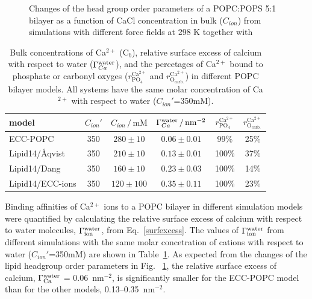 \begin{figure}[htb!]
  \caption{\label{fig:delta_ordPar_CaCl} 
    Changes of the head group order parameters of a POPC:POPS 5:1 bilayer as a function of CaCl concentration 
    in bulk ($C_{ion}$) from simulations with different force fields at 298 K together with  
  } 
\end{figure} 


\begin{table}[tb!] 
  \caption{Bulk concentrations of Ca$^{2+}$ (C$_b$), relative surface excess of calcium with respect to water ($\Gamma_{Ca}^{\rm water}$), 
    and the percetages of Ca$^{2+}$ bound to phosphate or carbonyl oxyges ($r^\mathrm{Ca^{2+}} _\mathrm{PO_4} $ and $r^\mathrm{Ca^{2+}} _\mathrm{O_{carb.}}$) 
    in different POPC bilayer models. All systems have the same molar concentration of Ca$^{2+}$ with respect to water ($C_{ion}'$=350mM). 
  \label{tab:binding}} 
  \begin{tabular}{l|c c | c | c c} 
    model                  & $C_{ion}'$ & $C_{ion}\,/\,\mathrm{mM}$ & $\Gamma_{Ca}^{\rm water} \,/\, \mathrm{nm}^{-2}$  & $r^\mathrm{Ca^{2+}} _\mathrm{PO_4} $ & $r^\mathrm{Ca^{2+}} _\mathrm{O_{carb.}} $ \\ 
    \hline 
    ECC-POPC             &  350  &  $280\pm 10 $  &  $0.06 \pm 0.01 $                           &  99\%  &    25\%    \\ 
    Lipid14/Åqvist     &  350  &  $210\pm 10 $  &  $0.13 \pm 0.01 $                          & 100\%  &    37\%     \\ 
    Lipid14/Dang           &  350  &  $160\pm 10 $  &  $0.23 \pm 0.03 $                            & 100\%  &    14\%    \\ 
    Lipid14/ECC-ions       &  350  &  $120\pm 100$  &  $0.35 \pm 0.11 $                         & 100\%  &    23\%    \\ 
  \end{tabular} 
\end{table} 

 
 
 
Binding affinities of Ca$^{2+}$ ions to a POPC bilayer in different simulation models were quantified by calculating the relative surface excess of calcium with respect to water molecules, $\Gamma_{\rm ion}^{\rm water}$, from Eq.~\ref{surfexcess}. 
The values of $\Gamma_{\rm ion}^{\rm water}$ 
from different simulations with the same molar concetration of cations with respect 
to water ($C_{ion}'$=350mM) are shown in Table~\ref{tab:binding}. 
As expected from the changes of the lipid headgroup order parameters in Fig.~ \ref{fig:delta_ordPar_CaCl}, the relative surface excess of calcium, $\Gamma_{\rm Ca}^{\rm water}$ = 0.06~nm$^{-2}$, is significantly smaller for the ECC-POPC model than for the other models, 0.13--0.35~nm$^{-2}$. 
 

